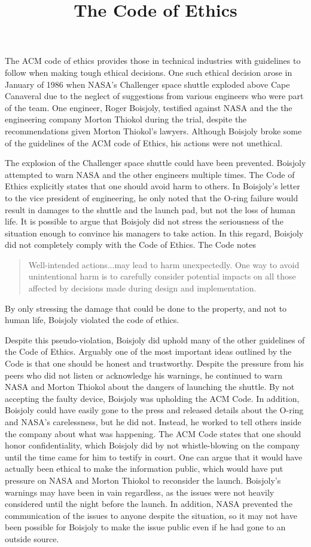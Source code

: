 \documentclass{paper}
\title{The Code of Ethics}
\begin{document}
\finalh{}
\inlinetitle

\begin{linenumbers}

The ACM code of ethics provides those in technical industries with guidelines to follow when making tough ethical decisions. One such ethical decision arose in January of 1986 when NASA's Challenger space shuttle exploded above Cape Canaveral due to the neglect of suggestions from various engineers who were part of the team. One engineer, Roger Boisjoly, testified against NASA and the the engineering company Morton Thiokol during the trial, despite the recommendations given Morton Thiokol's lawyers. Although Boisjoly broke some of the guidelines of the ACM code of Ethics, his actions were not unethical.

The explosion of the Challenger space shuttle could have been prevented. Boisjoly attempted to warn NASA and the other engineers multiple times. The Code of Ethics explicitly states that one should avoid harm to others. In Boisjoly's letter to the vice president of engineering, he only noted that the O-ring failure would result in damages to the shuttle and the launch pad, but not the loss of human life. It is possible to argue that Boisjoly did not stress the seriousness of the situation enough to convince his managers to take action. In this regard, Boisjoly did not completely comply with the Code of Ethics. The Code notes
\begin{quote}
Well-intended actions...may lead to harm unexpectedly. One way to avoid unintentional harm is to carefully consider potential impacts on all those affected by decisions made during design and implementation.
\end{quote}
By only stressing the damage that could be done to the property, and not to human life, Boisjoly violated the code of ethics.

Despite this pseudo-violation, Boisjoly did uphold many of the other guidelines of the Code of Ethics. Arguably one of the most important ideas outlined by the Code is that one should be honest and trustworthy. Despite the pressure from his peers who did not listen or acknowledge his warnings, he continued to warn NASA and Morton Thiokol about the dangers of launching the shuttle. By not accepting the faulty device, Boisjoly was upholding the ACM Code. In addition, Boisjoly could have easily gone to the press and released details about the O-ring and NASA's carelessness, but he did not. Instead, he worked to tell others inside the company about what was happening. The ACM Code states that one should honor confidentiality, which Boisjoly did by not whistle-blowing on the company until the time came for him to testify in court. One can argue that it would have actually been ethical to make the information public, which would have put pressure on NASA and Morton Thiokol to reconsider the launch. Boisjoly's warnings may have been in vain regardless, as the issues were not heavily considered until the night before the launch. In addition, NASA prevented the communication of the issues to anyone despite the situation, so it may not have been possible for Boisjoly to make the issue public even if he had gone to an outside source.


\end{linenumbers}
\end{document}
